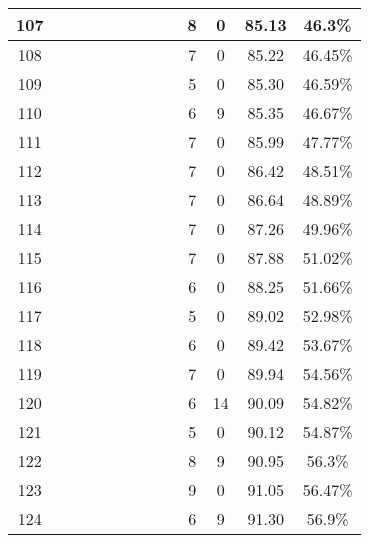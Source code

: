 \begin{longtable}{|c|c|c|c|c|c|c|c|c|c|c|c|c|}
107 &  \x    & \x    & \x    & \x    &       & \x\m  &       &       & 8 & 0 & 85.13 & 46.3\% \\ \hline
108 &  \x    & \x    & \x    & \x    &       & \x    & \x\m  &       & 7 & 0 & 85.22 & 46.45\% \\ \hline
109 &  \x    & \x    &       & \x    & \x    &       & \x    &       & 5 & 0 & 85.30 & 46.59\% \\ \hline
110 &  \x    & \x    & \x    &       &       & \x\m  & \x\m  &       & 6 & 9 & 85.35 & 46.67\% \\ \hline
111 &  \x    & \x    & \x    &       &       & \x\m  &       & \x    & 7 & 0 & 85.99 & 47.77\% \\ \hline
112 &  \x    & \x    &       &       &       & \x\m  &       & \x\m  & 7 & 0 & 86.42 & 48.51\% \\ \hline
113 &  \x    & \x    & \x    &       &       &       &       & \x    & 7 & 0 & 86.64 & 48.89\% \\ \hline
114 &  \x    & \x    & \x    & \x    &       &       & \x\m  &       & 7 & 0 & 87.26 & 49.96\% \\ \hline
115 &  \x    & \x    &       &       &       &       & \x    &       & 7 & 0 & 87.88 & 51.02\% \\ \hline
116 &  \x    & \x    &       & \x    & \x    & \x    & \x    &       & 6 & 0 & 88.25 & 51.66\% \\ \hline
117 &  \x    & \x    & \x    &       &       &       &       &       & 5 & 0 & 89.02 & 52.98\% \\ \hline
118 &  \x    & \x    &       &       &       & \x    & \x    &       & 6 & 0 & 89.42 & 53.67\% \\ \hline
119 &  \x    & \x    & \x    & \x    &       & \x\m  &       & \x    & 7 & 0 & 89.94 & 54.56\% \\ \hline
120 &  \x    & \x    &       &       & \x    &       & \x    &       & 6 & 14 & 90.09 & 54.82\% \\ \hline
121 &  \x    & \x    & \x    &       &       & \x\m  & \x\m  &       & 5 & 0 & 90.12 & 54.87\% \\ \hline
122 &  \x    & \x    &       & \x    &       &       &       &       & 8 & 9 & 90.95 & 56.3\% \\ \hline
123 &  \x    & \x    &       &       &       &       &       & \x\m  & 9 & 0 & 91.05 & 56.47\% \\ \hline
124 &  \x    & \x    &       & \x    &       & \x\m  &       &       & 6 & 9 & 91.30 & 56.9\% \\ \hline

\end{longtable}
